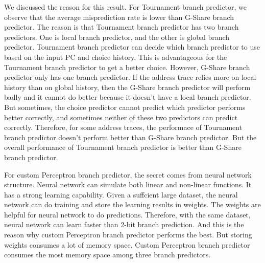 \documentclass[conference]{IEEEtran}
\begin{document}
We discussed the reason for this result. For Tournament branch predictor, we observe that the average misprediction rate is lower than G-Share branch predictor. 
The reason is that Tournament branch predictor has two branch predictors. One is local branch predictor, and the other is global branch predictor. Tournament branch predictor can decide which branch predictor to use 
based on the input PC and choice history. This is advantageous for the Tournament branch predictor to get a better choice. However, G-Share branch predictor only has one branch predictor. 
If the address trace relies more on local history than on global history, then the G-Share branch predictor will perform badly and it cannot do better because it doesn't have a local branch predictor. 
But sometimes, the choice predictor cannot predict which predictor performs better correctly, and sometimes neither of these two predictors can predict correctly. Therefore, for some address traces, the performace of Tournament 
branch predictor doesn't perform better than G-Share branch predictor. But the overall performance of Tournament branch predictor is better than G-Share branch predictor. 

For custom Perceptron branch predictor, the secret comes from neural network structure. Neural network can simulate both linear and non-linear functions. It has a strong learning capability. Given a suffcient large dataset, the neural network can do training and store the learning results in weights.
The weights are helpful for neural network to do predictions. Therefore, with the same dataset, neural network can learn faster than 2-bit branch prediction. And this is the reason why custom Perceptron branch predictor performs the best. 
But storing weights consumes a lot of memory space. Custom Perceptron branch predictor consumes the most memory space among three branch predictors. 




\end{document}
